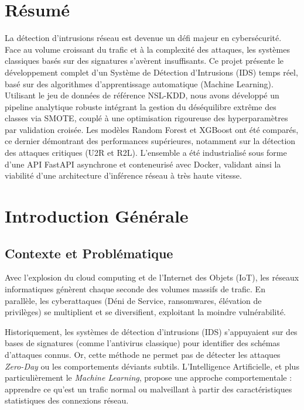\documentclass[12pt,a4paper]{report}
\begin{document}
\chapter*{Résumé}
La détection d'intrusions réseau est devenue un défi majeur en cybersécurité. Face au volume croissant du trafic et à la complexité des attaques, les systèmes classiques basés sur des signatures s'avèrent insuffisants. Ce projet présente le développement complet d'un Système de Détection d'Intrusions (IDS) temps réel, basé sur des algorithmes d'apprentissage automatique (Machine Learning). Utilisant le jeu de données de référence NSL-KDD, nous avons développé un pipeline analytique robuste intégrant la gestion du déséquilibre extrême des classes via SMOTE, couplé à une optimisation rigoureuse des hyperparamètres par validation croisée. Les modèles Random Forest et XGBoost ont été comparés, ce dernier démontrant des performances supérieures, notamment sur la détection des attaques critiques (U2R et R2L). L'ensemble a été industrialisé sous forme d'une API FastAPI asynchrone et conteneurisé avec Docker, validant ainsi la viabilité d'une architecture d'inférence réseau à très haute vitesse.

\tableofcontents
\listoffigures
\listoftables

\chapter{Introduction Générale}

\section{Contexte et Problématique}
Avec l'explosion du cloud computing et de l'Internet des Objets (IoT), les réseaux informatiques génèrent chaque seconde des volumes massifs de trafic. En parallèle, les cyberattaques (Déni de Service, ransomwares, élévation de privilèges) se multiplient et se diversifient, exploitant la moindre vulnérabilité. 

Historiquement, les systèmes de détection d'intrusions (IDS) s'appuyaient sur des bases de signatures (comme l'antivirus classique) pour identifier des schémas d'attaques connus. Or, cette méthode ne permet pas de détecter les attaques \textit{Zero-Day} ou les comportements déviants subtils. L'Intelligence Artificielle, et plus particulièrement le \textit{Machine Learning}, propose une approche comportementale : apprendre ce qu'est un trafic normal ou malveillant à partir des caractéristiques statistiques des connexions réseau.
\end{document}
